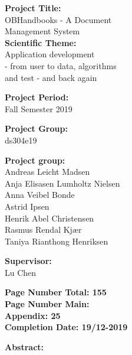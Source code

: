\begin{minipage}[t]{0.48\textwidth}
\textbf{Project Title:} \\[5pt]\hspace*{2ex}
OBHandbooks - A Document\\ Management System\\


\textbf{Scientific Theme:} \\[5pt]\hspace{2ex}
Application development\\ - from user to data, algorithms\\ and test - and back again

\textbf{Project Period:} \\[5pt]\bigskip\hspace{2ex}
Fall Semester 2019

\textbf{Project Group:} \\[5pt]\bigskip\hspace{2ex}
ds304e19

\textbf{Project group:} \\[5pt]\hspace*{2ex}
Andreas Leicht Madsen \\\hspace*{2ex}
Anja Elisasen Lumholtz Nielsen \\\hspace*{2ex}
Anna Veibel Bonde \\\hspace*{2ex}
Astrid Ipsen \\\hspace*{2ex}
Henrik Abel Christensen \\\hspace*{2ex}
Rasmus Rendal Kjær \\\hspace*{2ex}
Taniya Rianthong Henriksen \\\hspace*{2ex}

\textbf{Supervisor:} \\[5pt]\hspace*{2ex}
Lu Chen \\\hspace*{2ex}

\vspace*{1cm}

\textbf{Page Number Total: 155}\\
\textbf{Page Number Main: \pageref{LastPage} }\\
\textbf{Appendix: 25} \\ 
\textbf{Completion Date: 19/12-2019}

\end{minipage}
\hfill
\begin{minipage}[t]{0.483\textwidth}
\textbf{Abstract:} \\[5pt]
\fbox{\parbox{8cm}{\bigskip\bigskip}}
\end{minipage}

